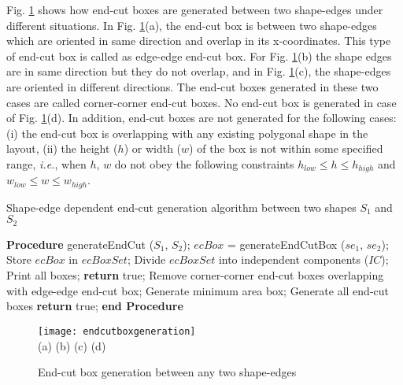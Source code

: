 \documentclass[12pt]{spieman}
\theoremstyle{plain}
\begin{document}
\begin{spacing}{1}
Fig. \ref{fig:endcutboxgeneration} shows how end-cut boxes are generated between two shape-edges under different situations. In Fig. \ref{fig:endcutboxgeneration}(a), the end-cut box is between two shape-edges which are oriented in same direction and overlap in its x-coordinates. This type of end-cut box is called as edge-edge end-cut box. For Fig. \ref{fig:endcutboxgeneration}(b) the shape edges are in same direction but they do not overlap, and in Fig. \ref{fig:endcutboxgeneration}(c), the shape-edges are oriented in different directions. The end-cut boxes generated in these two cases are called corner-corner end-cut boxes. No end-cut box is generated in case of Fig. \ref{fig:endcutboxgeneration}(d). In addition, end-cut boxes are not generated for the following cases: (i) the end-cut box is overlapping with any existing polygonal shape in the layout, (ii) the height ($h$) or width ($w$) of the box is not within some specified range, \textit{i.e.}, when $h$, $w$ do not obey the following constraints $h_{low} \le h \le h_{high}$ and $w_{low} \le w \le w_{high}$.

\begin{algorithm}[htb]
\caption{Shape-edge dependent end-cut generation algorithm between two shapes $S_{1}$ and $S_{2}$}\label{alg:endcutgeneration}
\begin{algorithmic}[1]
\State \textbf{Procedure} generateEndCut ($S_{1}$, $S_{2}$);
                \State $ecBox$ = generateEndCutBox ($se_{1}$, $se_{2}$);
                        \State Store $ecBox$ in $ecBoxSet$;
                \EndIf
        \EndFor
\EndFor
\State Divide $ecBoxSet$ into independent components ($IC$);
        \State Print all boxes;
        \State \textbf{return} true;
\EndIf
{}
        \State Remove corner-corner end-cut boxes overlapping with edge-edge end-cut box;
                \State Generate minimum area box;
        \Else
                \State Generate all end-cut boxes
        \EndIf
\EndFor
\State \textbf{return} true;
\State \textbf{end Procedure}
\end{algorithmic}
\end{algorithm}

\begin{figure}[htb]
  \centering
  \texttt{[image: endcutboxgeneration]}
  \\ \hspace{1.4cm} (a) \hspace{3.4cm} (b) \hspace{3.4cm} (c) \hspace{3.4cm} (d)
  \caption{End-cut box generation between any two shape-edges}
  \label{fig:endcutboxgeneration}
\end{figure}


\end{spacing}
\end{document}
